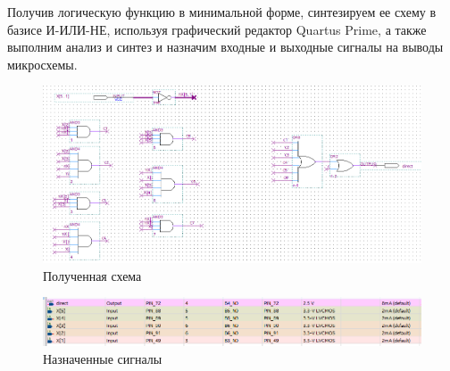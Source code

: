 \documentclass[a4paper,12pt]{article}
\begin{document}
	Получив логическую функцию в минимальной форме, синтезируем ее схему в базисе И-ИЛИ-НЕ, используя
	графический редактор Quartus Prime, а также выполним анализ и синтез и назначим входные и выходные
	сигналы на выводы микросхемы.
	\begin{figure}[H]
		\centering
		\includegraphics[width=\linewidth]{subfiles/images/scheme}
		\caption{Полученная схема}
		\label{fig:scheme}
	\end{figure}
	
	\begin{figure}[H]
		\centering
		\includegraphics[width=\linewidth]{subfiles/images/pins}
		\caption{Назначенные сигналы}
		\label{fig:pins}
	\end{figure}
	
\end{document}
